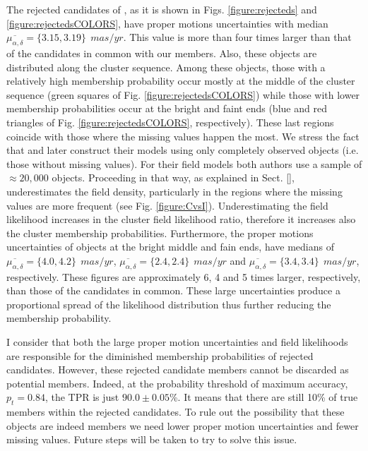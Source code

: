 The rejected candidates of \citet{Bouy2015}, as it is shown in Figs. \ref{figure:rejecteds} and \ref{figure:rejectedsCOLORS}, have proper motions uncertainties with median $\overline{\mu_{\alpha,\delta}}=\{3.15,3.19\} \ \ mas/yr$. This value is more than four times larger than that of the candidates in common with our members. Also, these objects are distributed along the cluster sequence. Among these objects, those with a relatively high membership probability occur mostly at the middle of the cluster sequence (green squares of Fig. \ref{figure:rejectedsCOLORS}) while those with lower membership probabilities occur at the bright and faint ends (blue and red triangles of Fig. \ref{figure:rejectedsCOLORS}, respectively). These last regions coincide with those where the missing values happen the most. We stress the fact that \citet{Sarro2014} and later \citet{Bouy2015} construct their models using only completely observed objects (i.e. those without missing values). For their field models both authors use a sample of $\approx 20,000$ objects. Proceeding in that way, as explained in Sect. \ref{}, underestimates the field density, particularly in the regions where the missing values are more frequent (see Fig. \ref{figure:CvsI}). Underestimating the field likelihood increases in the cluster field likelihood ratio, therefore it increases also the cluster membership probabilities. Furthermore, the proper motions uncertainties of objects at the bright middle and fain ends, have medians of $\overline{\mu_{\alpha,\delta}}=\{4.0,4.2\} \ \ mas/yr$, $\overline{\mu_{\alpha,\delta}}=\{2.4,2.4\} \ \ mas/yr$ and $\overline{\mu_{\alpha,\delta}}=\{3.4,3.4\} \ \ mas/yr$, respectively. These figures are approximately 6, 4 and 5 times larger, respectively, than those of the candidates in common. These large uncertainties produce a proportional spread of the likelihood distribution thus further reducing the membership probability.

I consider that both the large proper motion uncertainties and field likelihoods are responsible for the diminished membership probabilities of \citet{Bouy2015} rejected candidates. However, these rejected candidate members cannot be discarded as potential members. Indeed, at the probability threshold of maximum accuracy, $p_t=0.84$, the TPR is just $90.0\pm0.05$\%. It means that there are still 10\% of true members within the rejected candidates. To rule out the possibility that these objects are indeed members we need lower proper motion uncertainties and fewer missing values. Future steps will be taken to try to solve this issue.

